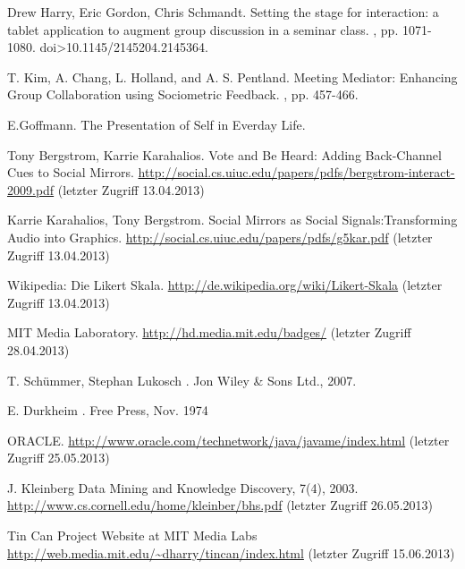 \documentclass{seminarvorlage}
\begin{document}
\begin{thebibliography}{[9]}

Drew Harry, Eric Gordon, Chris Schmandt.
\newblock Setting the stage for interaction: a tablet application to augment group discussion in a seminar class. 
, pp. 1071-1080. doi>10.1145/2145204.2145364. 


T. Kim, A. Chang, L. Holland, and A. S. Pentland.
\newblock Meeting Mediator: Enhancing Group Collaboration using Sociometric Feedback. 
, pp. 457-466.

E.Goffmann.
\newblock The Presentation of Self in Everday Life.

Tony Bergstrom, Karrie Karahalios. 
\newblock Vote and Be Heard: Adding Back-Channel Cues to Social Mirrors.
\newblock \url {http://social.cs.uiuc.edu/papers/pdfs/bergstrom-interact-2009.pdf} (letzter Zugriff 13.04.2013)

Karrie Karahalios, Tony Bergstrom. 
\newblock Social Mirrors as Social Signals:Transforming Audio into Graphics.
 \url {http://social.cs.uiuc.edu/papers/pdfs/g5kar.pdf} (letzter Zugriff 13.04.2013)

Wikipedia: Die Likert Skala.
\newblock \url {http://de.wikipedia.org/wiki/Likert-Skala} (letzter Zugriff 13.04.2013)

 MIT Media Laboratory. 
\newblock \url {http://hd.media.mit.edu/badges/} (letzter Zugriff 28.04.2013)

T. Schümmer, Stephan Lukosch
. Jon Wiley \& Sons Ltd., 2007.

E. Durkheim
. Free Press, Nov. 1974

 ORACLE. 
\newblock \url {http://www.oracle.com/technetwork/java/javame/index.html}
(letzter Zugriff 25.05.2013)

J. Kleinberg Data Mining and Knowledge Discovery, 7(4),
2003.
\newblock \url {http://www.cs.cornell.edu/home/kleinber/bhs.pdf} (letzter Zugriff 26.05.2013)


Tin Can Project Website at MIT Media Labs
\newblock \url {http://web.media.mit.edu/~dharry/tincan/index.html} (letzter Zugriff 15.06.2013)


\end{thebibliography}
\end{document}
